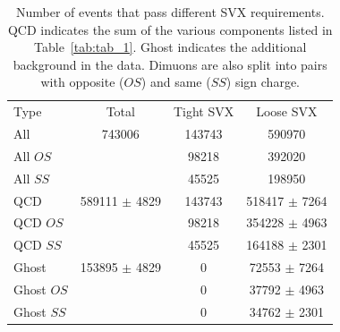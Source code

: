 \documentclass[aps,prd,preprint,floatfix,nofootinbib,superscriptaddress,showpacs,amssymb]{revtex4}
\begin{document}
 \begin{table}
 \caption[]{Number of events that pass different SVX requirements.
            QCD indicates the sum of the various components listed
            in Table~\ref{tab:tab_1}. Ghost indicates the additional
            background in the data. Dimuons are also split into pairs
            with opposite ($OS$) and same ($SS$) sign charge.}
 \begin{center}
 \begin{ruledtabular}
 \begin{tabular}{lccc}
  Type       & Total            & Tight SVX   & Loose SVX           \\
  All        & 743006             & 143743      & 590970            \\ 
  All $OS$   &                    &  98218      & 392020            \\
  All $SS$   &                    &  45525      & 198950            \\
  QCD        & 589111 $\pm$ 4829  & 143743      & 518417 $\pm$ 7264 \\    
  QCD $OS$   &                    &  98218      & 354228 $\pm$ 4963 \\
  QCD  $SS$  &                    &  45525      & 164188 $\pm$ 2301 \\
  Ghost      & 153895 $\pm$ 4829  &   0         & 72553  $\pm$ 7264 \\
  Ghost $OS$ &                    &   0         & 37792  $\pm$ 4963 \\
  Ghost $SS$ &                    &   0         & 34762  $\pm$ 2301 \\
 \end{tabular}
 \end{ruledtabular}
 \end{center}
 \label{tab:tab_2}
 \end{table}
\end{document}

